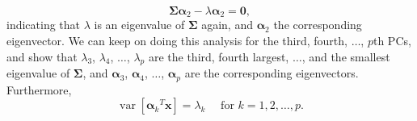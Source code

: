 \begin{equation}
	\boldsymbol{\Sigma} \boldsymbol{\alpha}_2-\lambda \boldsymbol{\alpha}_2=\mathbf{0},
\end{equation}
indicating that $\lambda$ is an eigenvalue of $\boldsymbol{\Sigma}$ again, and $\boldsymbol{\alpha}_2$ the corresponding eigenvector. We can keep on doing this analysis for the third, fourth, $\dots$, $p$th PCs, and show that $\lambda_3$, $\lambda_4$, $\dots$, $\lambda_p$ are the third, fourth largest, $\dots$, and the smallest eigenvalue of $\boldsymbol{\Sigma}$, and $\boldsymbol{\alpha}_3$, $\boldsymbol{\alpha}_4$, $\dots$, $\boldsymbol{\alpha}_p$ are the corresponding eigenvectors. Furthermore,
\begin{equation}
	\operatorname{var}\left[{\boldsymbol{\alpha}_k}^T \mathbf{x}\right]=\lambda_k \quad \text { for } k=1,2, \ldots, p.
\end{equation}
